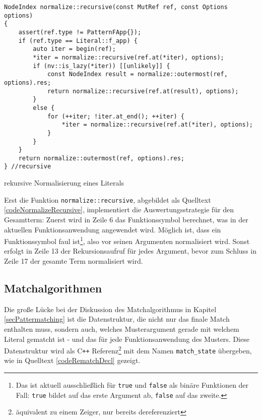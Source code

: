 \begin{listing}
\footnotesize
\begin{verbatim}
NodeIndex normalize::recursive(const MutRef ref, const Options options)
{
    assert(ref.type != PatternFApp{});
    if (ref.type == Literal::f_app) {
        auto iter = begin(ref);
        *iter = normalize::recursive(ref.at(*iter), options);
        if (nv::is_lazy(*iter)) [[unlikely]] {
            const NodeIndex result = normalize::outermost(ref, options).res;
            return normalize::recursive(ref.at(result), options);
        }
        else {
            for (++iter; !iter.at_end(); ++iter) {
                *iter = normalize::recursive(ref.at(*iter), options);
            }
        }
    }
    return normalize::outermost(ref, options).res;
} //recursive
\end{verbatim}
\caption{rekursive Normalisierung eines Literals}
\label{codeNormalizeRecursive}
\end{listing}

Erst die Funktion \verb|normalize::recursive|, abgebildet als Quelltext \ref{codeNormalizeRecursive}, implementiert die Auswertungsstrategie für den Gesamtterm: Zuerst wird in Zeile 6 das Funktionssymbol berechnet, was in der aktuellen Funktionsanwendung angewendet wird. Möglich ist, dass ein Funktionssymbol faul ist\footnote{Das ist aktuell ausschließlich für \texttt{true} und \texttt{false} als binäre Funktionen der Fall: \texttt{true} bildet auf das erste Argument ab, \texttt{false} auf das zweite.}, also vor seinen Argumenten normalisiert wird. 
Sonst erfolgt in Zeile 13 der Rekursionsaufruf für jedes Argument, bevor zum Schluss in Zeile 17 der gesamte Term normalisiert wird.



\subsection{Matchalgorithmen} \label{subsubsecMatchalgoCpp}

Die große Lücke bei der Diskussion des Matchalgorithmus in Kapitel \ref{secPattermatching} ist die Datenstruktur, die nicht nur das finale Match enthalten muss, sondern auch, welches Musterargument gerade mit welchem Literal gematcht ist - und das für jede Funktionsanwendung des Musters. Diese Datenstruktur wird als C\texttt{++} Referenz\footnote{äquivalent zu einem Zeiger, nur bereits dereferenziert} mit dem Namen \verb|match_state| übergeben, wie in Quelltext \ref{codeRematchDecl} gezeigt. 

